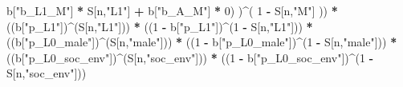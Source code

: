 \documentclass[
]{book}
\newenvironment{Shaded}{\begin{snugshade}}{\end{snugshade}}
\newcommand{\DecValTok}[1]{\textcolor[rgb]{0.00,0.00,0.81}{#1}}
\newcommand{\NormalTok}[1]{#1}
\newcommand{\SpecialCharTok}[1]{\textcolor[rgb]{0.81,0.36,0.00}{\textbf{#1}}}
\newcommand{\StringTok}[1]{\textcolor[rgb]{0.31,0.60,0.02}{#1}}
\begin{document}
\begin{Shaded}
\begin{Highlighting}[]
\NormalTok{                b[}\StringTok{"b\_L1\_M"}\NormalTok{] }\SpecialCharTok{*}\NormalTok{ S[n,}\StringTok{"L1"}\NormalTok{] }\SpecialCharTok{+}
\NormalTok{                b[}\StringTok{"b\_A\_M"}\NormalTok{] }\SpecialCharTok{*} \DecValTok{0}\NormalTok{) )}\SpecialCharTok{\^{}}\NormalTok{( }\DecValTok{1} \SpecialCharTok{{-}}\NormalTok{ S[n,}\StringTok{"M"}\NormalTok{] ))  }\SpecialCharTok{*}
\NormalTok{      ((b[}\StringTok{"p\_L1"}\NormalTok{])}\SpecialCharTok{\^{}}\NormalTok{(S[n,}\StringTok{"L1"}\NormalTok{])) }\SpecialCharTok{*}
\NormalTok{      ((}\DecValTok{1} \SpecialCharTok{{-}}\NormalTok{ b[}\StringTok{"p\_L1"}\NormalTok{])}\SpecialCharTok{\^{}}\NormalTok{(}\DecValTok{1} \SpecialCharTok{{-}}\NormalTok{ S[n,}\StringTok{"L1"}\NormalTok{])) }\SpecialCharTok{*}
\NormalTok{      ((b[}\StringTok{"p\_L0\_male"}\NormalTok{])}\SpecialCharTok{\^{}}\NormalTok{(S[n,}\StringTok{"male"}\NormalTok{])) }\SpecialCharTok{*} 
\NormalTok{      ((}\DecValTok{1} \SpecialCharTok{{-}}\NormalTok{ b[}\StringTok{"p\_L0\_male"}\NormalTok{])}\SpecialCharTok{\^{}}\NormalTok{(}\DecValTok{1} \SpecialCharTok{{-}}\NormalTok{ S[n,}\StringTok{"male"}\NormalTok{])) }\SpecialCharTok{*} 
\NormalTok{      ((b[}\StringTok{"p\_L0\_soc\_env"}\NormalTok{])}\SpecialCharTok{\^{}}\NormalTok{(S[n,}\StringTok{"soc\_env"}\NormalTok{])) }\SpecialCharTok{*}
\NormalTok{      ((}\DecValTok{1} \SpecialCharTok{{-}}\NormalTok{ b[}\StringTok{"p\_L0\_soc\_env"}\NormalTok{])}\SpecialCharTok{\^{}}\NormalTok{(}\DecValTok{1} \SpecialCharTok{{-}}\NormalTok{ S[n,}\StringTok{"soc\_env"}\NormalTok{])) }
    

\end{Highlighting}
\end{Shaded}
\end{document}
